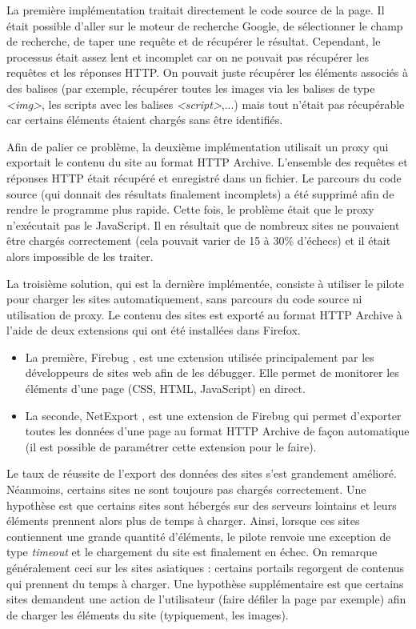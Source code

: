 La première implémentation traitait directement le code source de la page. Il était possible d'aller sur le moteur de recherche Google, de sélectionner le champ de recherche, de taper une requête et de récupérer le résultat. Cependant, le processus était assez lent et incomplet car on ne pouvait pas récupérer les requêtes et les réponses HTTP. On pouvait juste récupérer les éléments associés à des balises (par exemple, récupérer toutes les images via les balises de type \textit{<img>}, les scripts avec les balises \textit{<script>},...) mais tout n'était pas récupérable car certains éléments étaient chargés sans être identifiés.

Afin de palier ce problème, la deuxième implémentation utilisait un proxy qui exportait le contenu du site au format HTTP Archive. L'ensemble des requêtes et réponses HTTP était récupéré et enregistré dans un fichier. Le parcours du code source (qui donnait des résultats finalement incomplets) a été supprimé afin de rendre le programme plus rapide. Cette fois, le problème était que le proxy n'exécutait pas le JavaScript. Il en résultait que de nombreux sites ne pouvaient être chargés correctement (cela pouvait varier de 15 à 30\% d'échecs) et il était alors impossible de les traiter.

La troisième solution, qui est la dernière implémentée, consiste à utiliser le pilote pour charger les sites automatiquement, sans parcours du code source ni utilisation de proxy. Le contenu des sites est exporté au format HTTP Archive à l'aide de deux extensions qui ont été installées dans Firefox.
\begin{itemize}
	\item La première, Firebug \cite{firebug_homepage}, est une extension utilisée principalement par les développeurs de sites web afin de les débugger. Elle permet de monitorer les éléments d'une page (CSS, HTML, JavaScript) en direct.
	\item La seconde, NetExport \cite{netexport_homepage}, est une extension de Firebug qui permet d'exporter toutes les données d'une page au format HTTP Archive de façon automatique (il est possible de paramétrer cette extension pour le faire).
\end{itemize}

Le taux de réussite de l'export des données des sites s'est grandement amélioré. Néanmoins, certains sites ne sont toujours pas chargés correctement.
Une hypothèse est que certains sites sont hébergés sur des serveurs lointains et leurs éléments prennent alors plus de temps à charger. Ainsi, lorsque ces sites contiennent une grande quantité d'éléments, le pilote renvoie une exception de type \textit{timeout} et le chargement du site est finalement en échec. On remarque généralement ceci sur les sites asiatiques : certains portails regorgent de contenus qui prennent du temps à charger.
Une hypothèse supplémentaire est que certains sites demandent une action de l'utilisateur (faire défiler la page par exemple) afin de charger les éléments du site (typiquement, les images).
\newline

